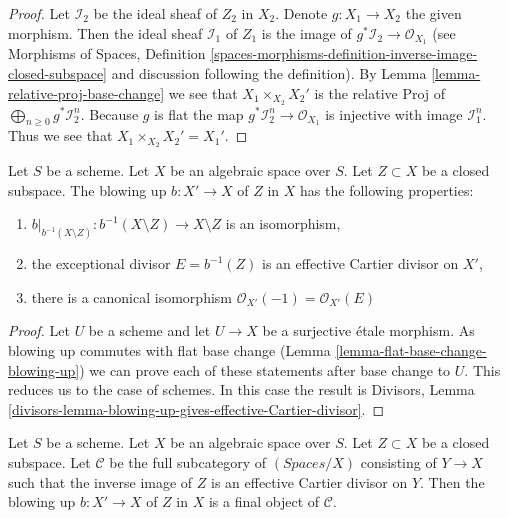 \begin{proof}
Let $\mathcal{I}_2$ be the ideal sheaf of $Z_2$ in $X_2$.
Denote $g : X_1 \to X_2$ the given morphism. Then the ideal sheaf
$\mathcal{I}_1$ of $Z_1$ is the image of
$g^*\mathcal{I}_2 \to \mathcal{O}_{X_1}$
(see Morphisms of Spaces, Definition
\ref{spaces-morphisms-definition-inverse-image-closed-subspace}
and discussion following the definition).
By Lemma \ref{lemma-relative-proj-base-change}
we see that $X_1 \times_{X_2} X_2'$ is the relative Proj of
$\bigoplus_{n \geq 0} g^*\mathcal{I}_2^n$. Because $g$ is flat the map
$g^*\mathcal{I}_2^n \to \mathcal{O}_{X_1}$ is injective with image
$\mathcal{I}_1^n$. Thus we see that $X_1 \times_{X_2} X_2' = X_1'$.
\end{proof}

\begin{lemma}
\label{lemma-blowing-up-gives-effective-Cartier-divisor}
Let $S$ be a scheme. Let $X$ be an algebraic space over $S$.
Let $Z \subset X$ be a closed subspace.
The blowing up $b : X' \to X$ of $Z$ in $X$
has the following properties:
\begin{enumerate}
\item $b|_{b^{-1}(X \setminus Z)} : b^{-1}(X \setminus Z) \to X \setminus Z$
is an isomorphism,
\item the exceptional divisor $E = b^{-1}(Z)$ is an effective Cartier divisor
on $X'$,
\item there is a canonical isomorphism
$\mathcal{O}_{X'}(-1) = \mathcal{O}_{X'}(E)$
\end{enumerate}
\end{lemma}

\begin{proof}
Let $U$ be a scheme and let $U \to X$ be a surjective \'etale morphism.
As blowing up commutes with flat base change
(Lemma \ref{lemma-flat-base-change-blowing-up})
we can prove each of these statements after base change to $U$.
This reduces us to the case of schemes.
In this case the result is
Divisors, Lemma
\ref{divisors-lemma-blowing-up-gives-effective-Cartier-divisor}.
\end{proof}

\begin{lemma}
\label{lemma-universal-property-blowing-up}
Let $S$ be a scheme.
Let $X$ be an algebraic space over $S$.
Let $Z \subset X$ be a closed subspace.
Let $\mathcal{C}$ be the full subcategory of $(\textit{Spaces}/X)$ consisting
of $Y \to X$ such that the inverse image of $Z$ is an effective
Cartier divisor on $Y$. Then the blowing up $b : X' \to X$ of $Z$ in $X$
is a final object of $\mathcal{C}$.
\end{lemma}

